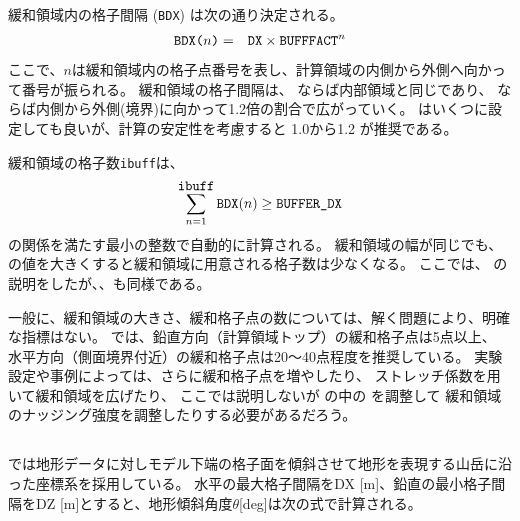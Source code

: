 緩和領域内の格子間隔 (\verb|BDX|) は次の通り決定される。
\begin{eqnarray}
 \verb|BDX(|n\verb|)| &=& \verb|DX| \times \verb|BUFFFACT|^n \nonumber
\end{eqnarray}
ここで、$n$は緩和領域内の格子点番号を表し、計算領域の内側から外側へ向かって番号が振られる。
緩和領域の格子間隔は、
ならば内部領域と同じであり、
ならば内側から外側(境界)に向かって1.2倍の割合で広がっていく。
はいくつに設定しても良いが、計算の安定性を考慮すると 1.0から1.2 が推奨である。

緩和領域の格子数\verb|ibuff|は、
\begin{eqnarray}
\sum_{n=1}^{\verb|ibuff|} \verb|BDX|(n) \ge \verb|BUFFER_DX| \nonumber
\end{eqnarray}
の関係を満たす最小の整数で自動的に計算される。
%
緩和領域の幅が同じでも、
の値を大きくすると緩和領域に用意される格子数は少なくなる。
ここでは、{\XDIR} の説明をしたが、{\YDIR}、{\ZDIR}も同様である。



一般に、緩和領域の大きさ、緩和格子点の数については、解く問題により、明確な指標はない。
\scalerm では、鉛直方向（計算領域トップ）の緩和格子点は5点以上、
水平方向（側面境界付近）の緩和格子点は20〜40点程度を推奨している。
実験設定や事例によっては、さらに緩和格子点を増やしたり、
ストレッチ係数を用いて緩和領域を広げたり、
ここでは説明しないが
の中の
を調整して
緩和領域のナッジング強度を調整したりする必要があるだろう。




\subsection{\SecBasicTopoSetting} \label{subsec:basic_usel_topo}

\scalerm では地形データに対しモデル下端の格子面を傾斜させて地形を表現する山岳に沿った座標系を採用している。
水平の最大格子間隔をDX [m]、鉛直の最小格子間隔をDZ [m]とすると、地形傾斜角度$\theta$[deg]は次の式で計算される。

